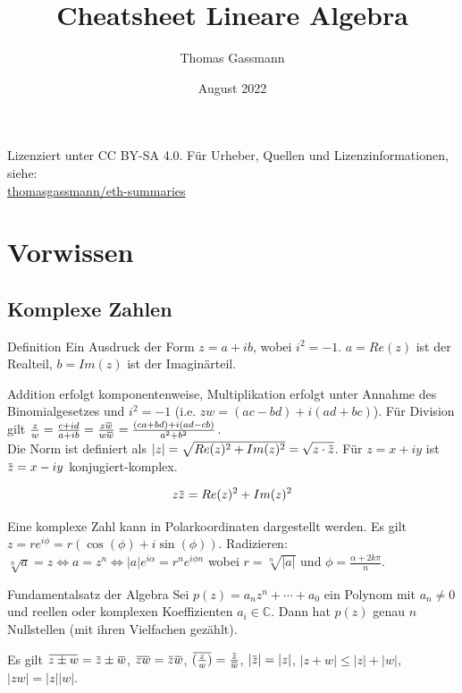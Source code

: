 \documentclass[a4paper,10pt]{article}
\title{Cheatsheet Lineare Algebra}
\author{Thomas Gassmann}
\date{August 2022}
\newcommand{\overbar}[1]{\mkern 1.5mu\overline{\mkern-1.5mu#1\mkern-1.5mu}\mkern 1.5mu}
\begin{document}
\begin{center}
  Lizenziert unter CC BY-SA 4.0. Für Urheber, Quellen und Lizenzinformationen, siehe:\\
  \href{https://github.com/thomasgassmann/eth-summaries}{thomasgassmann/eth-summaries}
\end{center}

\section{Vorwissen}
\subsection{Komplexe Zahlen}
\begin{mainbox}{Definition}
Ein Ausdruck der Form $z = a + ib$, wobei $i^2 = -1$. $a = Re(z)$ ist der Realteil, $b = Im(z)$ ist der Imaginärteil.
\end{mainbox}

Addition erfolgt komponentenweise, Multiplikation erfolgt unter Annahme des Binomialgesetzes und $i^2 = -1$ (i.e. $z w = (a c - b d) + i (a d + b  c)$). Für Division gilt $\frac{z}{w} = \frac{c + id}{a + ib} = \frac{z\overbar{w}}{w\overbar{w}} = \frac{(ca + bd) + i(ad - cb)}{a^2 + b^2}$.\\
Die Norm ist definiert als $|z| = \sqrt{Re(z)^2 + Im(z)^2} = \sqrt{z \cdot \overbar{z}}$. Für $z = x + iy$ ist $\overbar{z} = x - iy$ konjugiert-komplex.

\begin{subbox}{}
$$z \overbar{z} = Re(z)^2 + Im(z)^2$$
\end{subbox}

Eine komplexe Zahl kann in Polarkoordinaten dargestellt werden. Es gilt $z = re^{i\phi} = r(\cos(\phi) + i\sin(\phi))$.
Radizieren: $\sqrt[n]{a} = z \Leftrightarrow a = z^n \Leftrightarrow |a| e^{i\alpha} = r^n e^{i\phi n}$ wobei $r = \sqrt[n]{|a|}$ und $\phi = \frac{\alpha + 2k\pi}{n}$.

\begin{mainbox}{Fundamentalsatz der Algebra}
  Sei $p(z) = a_n z^n + \cdots + a_0$ ein Polynom mit $a_n \neq 0$ und reellen oder komplexen Koeffizienten $a_i \in \mathbb{C}$. Dann hat $p(z)$ genau $n$ Nullstellen (mit ihren Vielfachen gezählt).
\end{mainbox}

Es gilt $\overbar{z \pm w} = \overbar{z} \pm \overbar{w}$, $\overbar{zw} = \overbar{z}\overbar{w}$, $\overbar{(\frac{z}{w})} = \frac{\overbar{z}}{\overbar{w}}$, $|\overbar{z}| = |z|$, $|z + w| \leq |z| + |w|$, $|zw| = |z| |w|$.
\end{document}
